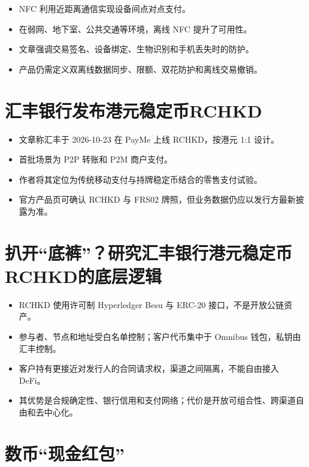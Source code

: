 \begin{itemize}
\tightlist
\item
  NFC 利用近距离通信实现设备间点对点支付。
\item
  在弱网、地下室、公共交通等环境，离线 NFC 提升了可用性。
\item
  文章强调交易签名、设备绑定、生物识别和手机丢失时的防护。
\item
  产品仍需定义双离线数据同步、限额、双花防护和离线交易撤销。
\end{itemize}

\section{汇丰银行发布港元稳定币RCHKD}\label{ux6c47ux4e30ux94f6ux884cux53d1ux5e03ux6e2fux5143ux7a33ux5b9aux5e01rchkd}

\begin{itemize}
\tightlist
\item
  文章称汇丰于 2026-10-23 在 PayMe 上线 RCHKD，按港元 1:1 设计。
\item
  首批场景为 P2P 转账和 P2M 商户支付。
\item
  作者将其定位为传统移动支付与持牌稳定币结合的零售支付试验。
\item
  官方产品页可确认 RCHKD 与 FRS02 牌照，但业务数据仍应以发行方最新披露为准。
\end{itemize}

\section{扒开``底裤''？研究汇丰银行港元稳定币RCHKD的底层逻辑}\label{ux6252ux5f00ux5e95ux88e4ux7814ux7a76ux6c47ux4e30ux94f6ux884cux6e2fux5143ux7a33ux5b9aux5e01rchkdux7684ux5e95ux5c42ux903bux8f91}

\begin{itemize}
\tightlist
\item
  RCHKD 使用许可制 Hyperledger Besu 与 ERC-20 接口，不是开放公链资产。
\item
  参与者、节点和地址受白名单控制；客户代币集中于 Omnibus 钱包，私钥由汇丰控制。
\item
  客户持有更接近对发行人的合同请求权，渠道之间隔离，不能自由接入 DeFi。
\item
  其优势是合规确定性、银行信用和支付网络；代价是开放可组合性、跨渠道自由和去中心化。
\end{itemize}

\section{数币``现金红包''}\label{ux6570ux5e01ux73b0ux91d1ux7ea2ux5305}


